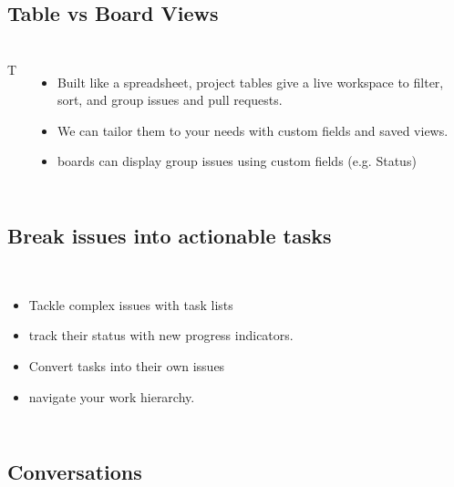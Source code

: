 \subsection{Table vs Board Views}
\begin{frame}
  \frametitle{\insertsectionhead}
  \framesubtitle{\insertsubsectionhead}
  \begin{columns}{T}
    \begin{itemize}
        \item Built like a spreadsheet, project tables give a live workspace to filter, sort, and group issues and pull requests. 
        \item We can tailor them to your needs with custom fields and saved views.
        \item boards can display group issues using custom fields (e.g. Status)
    \end{itemize}
  \end{columns}
\end{frame}

\subsection{Break issues into actionable tasks}

\begin{frame}
  \frametitle{\insertsectionhead}
  \framesubtitle{\insertsubsectionhead}
  \begin{columns}
    \begin{itemize}
      \item Tackle complex issues with task lists 
      \item track their status with new progress indicators. 
      \item Convert tasks into their own issues 
      \item navigate your work hierarchy.
  \end{itemize}
  \end{columns}
\end{frame}


\subsection{Conversations}


